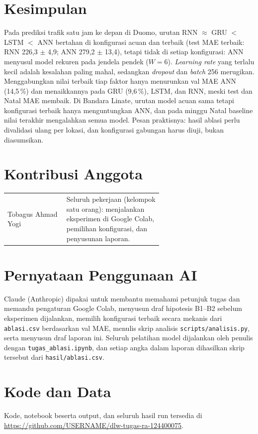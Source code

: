 \documentclass[10pt,twocolumn,a4paper]{article}
\begin{document}
\section{Kesimpulan}
Pada prediksi trafik satu jam ke depan di Duomo, urutan RNN $\approx$ GRU $<$ LSTM $<$ ANN bertahan di konfigurasi acuan dan terbaik (test MAE terbaik: RNN 226,3 $\pm$ 4,9; ANN 279,2 $\pm$ 13,4), tetapi tidak di setiap konfigurasi: ANN menyusul model rekuren pada jendela pendek ($W=6$). \textit{Learning rate} yang terlalu kecil adalah kesalahan paling mahal, sedangkan \textit{dropout} dan \textit{batch} 256 merugikan. Menggabungkan nilai terbaik tiap faktor hanya menurunkan val MAE ANN (14,5\,\%) dan menaikkannya pada GRU (9,6\,\%), LSTM, dan RNN, meski test dan Natal MAE membaik. Di Bandara Linate, urutan model acuan sama tetapi konfigurasi terbaik hanya menguntungkan ANN, dan pada minggu Natal baseline nilai terakhir mengalahkan semua model. Pesan praktisnya: hasil ablasi perlu divalidasi ulang per lokasi, dan konfigurasi gabungan harus diuji, bukan diasumsikan.

\section*{Kontribusi Anggota}
\begin{tabular}{@{}lp{0.62\linewidth}@{}}
  Tobagus Ahmad Yogi & Seluruh pekerjaan (kelompok satu orang): menjalankan eksperimen di Google Colab, pemilihan konfigurasi, dan penyusunan laporan. \\
\end{tabular}

\section*{Pernyataan Penggunaan AI}
Claude (Anthropic) dipakai untuk membantu memahami petunjuk tugas dan memandu pengaturan Google Colab, menyusun draf hipotesis B1--B2 sebelum eksperimen dijalankan, memilih konfigurasi terbaik secara mekanis dari \texttt{ablasi.csv} berdasarkan val MAE, menulis skrip analisis \texttt{scripts/analisis.py}, serta menyusun draf laporan ini. Seluruh pelatihan model dijalankan oleh penulis dengan \texttt{tugas\_ablasi.ipynb}, dan setiap angka dalam laporan dihasilkan skrip tersebut dari \texttt{hasil/ablasi.csv}.

\section*{Kode dan Data}
Kode, notebook beserta output, dan seluruh hasil run tersedia di \url{https://github.com/USERNAME/dlw-tugas-ra-124400075}.



\end{document}
